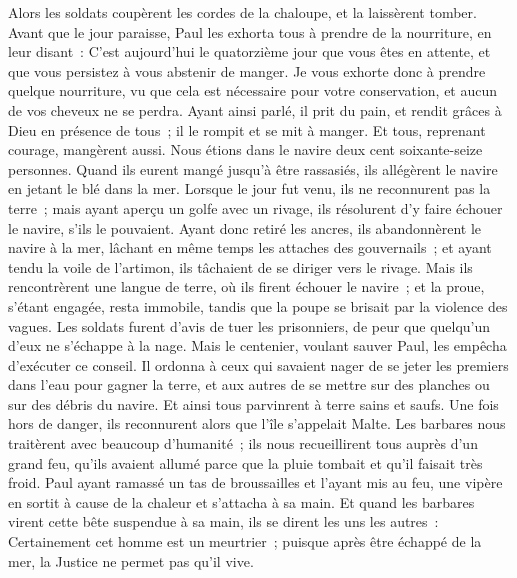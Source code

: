 \begin{multicols}{2}
Alors les soldats coupèrent les cordes de la chaloupe, et la laissèrent tomber.
Avant que le jour paraisse, Paul les exhorta tous à prendre de la nourriture, en leur disant~: C'est aujourd'hui le quatorzième jour que vous êtes en attente, et que vous persistez à vous abstenir de manger.
Je vous exhorte donc à prendre quelque nourriture, vu que cela est nécessaire pour votre conservation, et aucun de vos cheveux ne se perdra.
Ayant ainsi parlé, il prit du pain, et rendit grâces à Dieu en présence de tous~; il le rompit et se mit à manger.
Et tous, reprenant courage, mangèrent aussi.
Nous étions dans le navire deux cent soixante-seize personnes.
Quand ils eurent mangé jusqu'à être rassasiés, ils allégèrent le navire en jetant le blé dans la mer.
Lorsque le jour fut venu, ils ne reconnurent pas la terre~; mais ayant aperçu un golfe avec un rivage, ils résolurent d'y faire échouer le navire, s'ils le pouvaient.
Ayant donc retiré les ancres, ils abandonnèrent le navire à la mer, lâchant en même temps les attaches des gouvernails~; et ayant tendu la voile de l'artimon, ils tâchaient de se diriger vers le rivage.
Mais ils rencontrèrent une langue de terre, où ils firent échouer le navire~; et la proue, s'étant engagée, resta immobile, tandis que la poupe se brisait par la violence des vagues.
Les soldats furent d'avis de tuer les prisonniers, de peur que quelqu'un d'eux ne s'échappe à la nage.
Mais le centenier, voulant sauver Paul, les empêcha d'exécuter ce conseil. Il ordonna à ceux qui savaient nager de se jeter les premiers dans l'eau pour gagner la terre,
et aux autres de se mettre sur des planches ou sur des débris du navire. Et ainsi tous parvinrent à terre sains et saufs.
\VerseOne{}Une fois hors de danger, ils reconnurent alors que l'île s'appelait Malte.
Les barbares nous traitèrent avec beaucoup d'humanité~; ils nous recueillirent tous auprès d'un grand feu, qu'ils avaient allumé parce que la pluie tombait et qu'il faisait très froid.
Paul ayant ramassé un tas de broussailles et l'ayant mis au feu, une vipère en sortit à cause de la chaleur et s'attacha à sa main.
Et quand les barbares virent cette bête suspendue à sa main, ils se dirent les uns les autres~: Certainement cet homme est un meurtrier~; puisque après être échappé de la mer, la Justice ne permet pas qu'il vive. 

\end{multicols}
